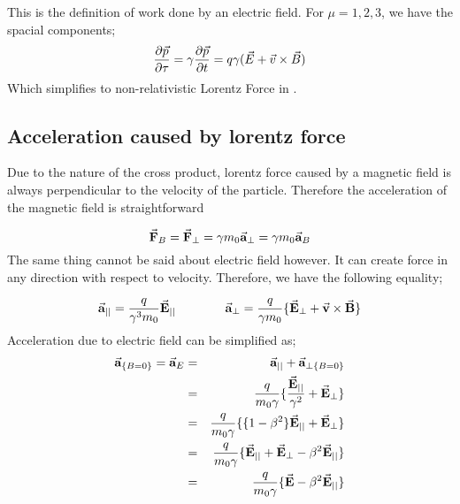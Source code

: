 \documentclass{article}
\begin{document}
This is the definition of work done by an electric field. For $ \mu = 1,2,3 $, we have the spacial components;
\newline
\begin{equation*}
    \frac{\partial \vec{p}}{\partial \tau} = \gamma \frac{\partial \vec{p}}{\partial t} = q \gamma (\vec{E} + \vec{v} \times \vec{B})
\end{equation*}
\newline
Which simplifies to non-relativistic Lorentz Force in .



\subsection{Acceleration caused by lorentz force}
Due to the nature of the cross product, lorentz force caused by a magnetic field is always perpendicular to the velocity of the particle. Therefore the acceleration of the magnetic field is straightforward

\begin{equation*}
    \vec{\textbf{F}}_B = \vec{\textbf{F}}_{\perp} = \gamma  m_0\vec{\textbf{a}}_{\perp} = \gamma  m_0\vec{\textbf{a}}_{B}
\end{equation*}
\newline
The same thing cannot be said about electric field however. It can create force in any direction with respect to velocity. Therefore, we have the following equality;

\begin{equation} \label{eq:para_and_perp_acc_of_lorentz_force}
    \begin{aligned}
        \vec{\textbf{a}}_{||} = \frac{q }{\gamma^3 m_0} \vec{\textbf{E}}_{||}
    \end{aligned}
    \qquad \qquad
    \begin{aligned}
        \vec{\textbf{a}}_{\perp} = \frac{q}{\gamma m_0} \{ \vec{\textbf{E}}_{\perp} + \vec{\textbf{v}} \times \vec{\textbf{B}}   \}
    \end{aligned}    
\end{equation}
\newline
Acceleration due to electric field can be simplified as;
\begin{eqnarray*}
    \vec{\textbf{a}}_{\{B=0\}} = \vec{\textbf{a}}_{E}   &=&  \vec{\textbf{a}}_{||} + \vec{\textbf{a}}_{\perp \{B=0\}} \\
                                &=& \frac{q}{m_0 \gamma} \{ \frac{\vec{\textbf{E}}_{||}}{\gamma^2} + \vec{\textbf{E}}_{\perp} \} \\
                                &=& \frac{q}{m_0 \gamma} \{ \{1 - \beta^2\}\vec{\textbf{E}}_{||} + \vec{\textbf{E}}_{\perp} \} \\
                                &=& \frac{q}{m_0 \gamma} \{ \vec{\textbf{E}}_{||} + \vec{\textbf{E}}_{\perp}-\beta^2\vec{\textbf{E}}_{||} \} \\
                                &=& \frac{q}{m_0 \gamma} \{ \vec{\textbf{E}} - \beta^2\vec{\textbf{E}}_{||} \} \\
\end{eqnarray*}
\end{document}
